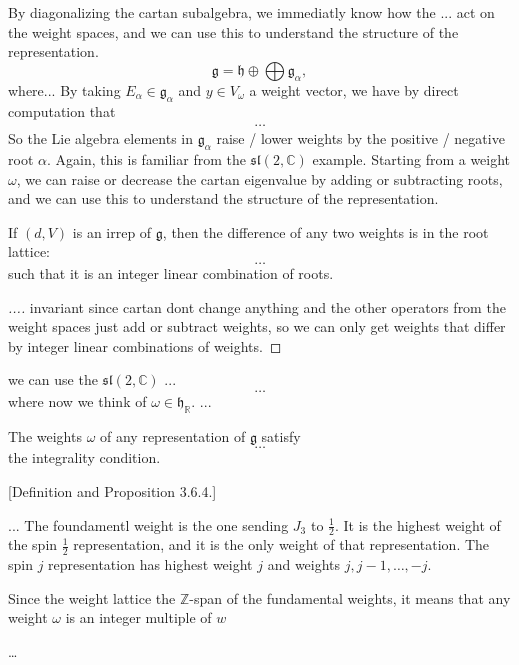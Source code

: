 By diagonalizing the cartan subalgebra, we immediatly know how the ... act on the weight spaces, and we can use this to understand the structure of the representation.
\[
    \mathfrak{g} = \mathfrak{h} \oplus \bigoplus \mathfrak{g}_{\alpha},
\]
where...
By taking \(E_{\alpha} \in \mathfrak{g}_{\alpha}\) and \(y \in V_\omega\) a weight vector, we have by direct computation that
\[
    \begin{aligned}
        \dots
    \end{aligned}
\]
So the Lie algebra elements in \(\mathfrak{g}_{\alpha}\) raise / lower weights by the positive / negative root \(\alpha\). Again, this is familiar from the \(\mathfrak{sl}(2, \mathbb{C})\) example. Starting from a weight \(\omega\), we can raise or decrease the cartan eigenvalue by adding or subtracting roots, and we can use this to understand the structure of the representation.

\begin{proposition}
    If \((d,V)\) is an irrep of \(\mathfrak{g}\), then the difference of any two weights is in the root lattice:
    \[
        \dots
    \]
    such that it is an integer linear combination of roots.
\end{proposition}
\begin{proof}
    [...]
    invariant since cartan dont change anything and the other operators from the weight spaces just add or subtract weights, so we can only get weights that differ by integer linear combinations of weights.
\end{proof}

we can use the \(\mathfrak{sl}(2, \mathbb{C})\) ...
\[
    \dots
\]
where now we think of \(\omega \in \mathfrak{h}_\mathbb{R}\).
...

\begin{theorem}
    The weights \(\omega\) of any representation of \(\mathfrak{g}\) satisfy
    \[
        \dots
    \]
    the integrality condition.
\end{theorem}


[Definition and Proposition 3.6.4.]


\begin{example}[\(\mathfrak{g} = \mathfrak{su}(2)_\mathbb{C} = \mathfrak{sl}(2, \mathbb{C})\)]
    ...
    The foundamentl weight is the one sending \(J_3\) to \(\tfrac{1}{2}\).
    It is the highest weight of the spin \(\tfrac{1}{2}\) representation, and it is the only weight of that representation. The spin \(j\) representation has highest weight \(j\) and weights \(j, j-1, \ldots, -j\).

    Since the weight lattice the \(\mathbb{Z}\)-span of the fundamental weights, it means that any weight \(\omega\) is an integer multiple of \(w\)

    \dots
\end{example}

